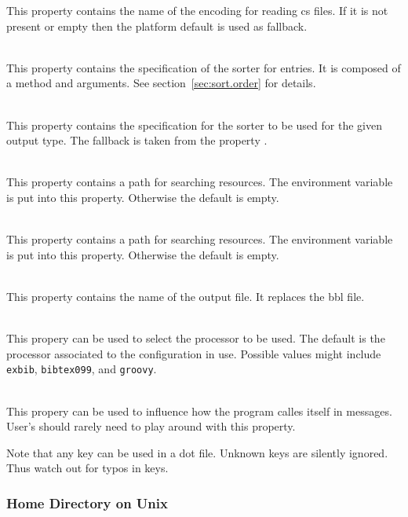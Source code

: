 \begin{description}
  This property contains the name of the encoding for reading cs
  files. If it is not present or empty then the platform default is
  used as fallback.
\item[\Property{exbib.sort}] \ \\
  This property contains the specification of the sorter for entries.
  It is composed of a method and arguments. See
  section~\ref{sec:sort.order} for details.
\item[\property{exbib.sort.\protect\Arg{type}}{exbib.sort.type}] \ \\
  This property contains the specification for the sorter to be used
  for the given output type. The fallback is taken from the property
  .
\item[\Property{texinputs}] \ \\
  This property contains a path for searching resources. The
  environment variable  is put into this property.
  Otherwise the default is empty.
\item[\Property{extex.texinputs}]  \ \\
  This property contains a path for searching resources. The
  environment variable  is put into this property.
  Otherwise the default is empty.
\item[\Property{exbib.output}] \ \\
  This property contains the name of the output file. It replaces the
  bbl file.
\item[\Property{exbib.processor}] \ \\
  This propery can be used to select the processor to be used. The
  default is the processor associated to the configuration in use.
  Possible values might include \texttt{exbib}, \texttt{bibtex099},
  and \texttt{groovy}.
\item[\Property{program.name}] \ \\
  This propery can be used to influence how the program calles itself
  in messages. User's should rarely need to play around with this
  property.
\end{description}

Note that any key can be used in a dot file. Unknown
keys are silently ignored. Thus watch out for typos in keys.


\subsubsection{Home Directory on Unix}%

